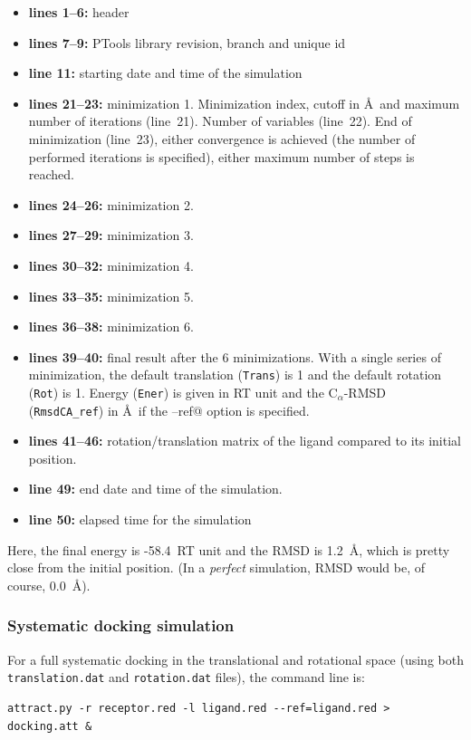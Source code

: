\documentclass[12pt,a4paper]{article}
\begin{document}
\begin{itemize}
\item{\bf lines 1--6:} header
\item{\bf lines 7--9:} PTools library revision, branch and unique id
\item{\bf line 11:} starting date and time of the simulation
\item{\bf lines 21--23:} minimization 1. Minimization index, cutoff 
in \AA\ and maximum number of iterations (line~21). 
Number of variables (line~22). End of minimization (line~23), either 
convergence is achieved (the number of performed iterations is specified), 
either maximum number of steps is reached.
\item{\bf lines 24--26:} minimization 2.
\item{\bf lines 27--29:} minimization 3.
\item{\bf lines 30--32:} minimization 4.
\item{\bf lines 33--35:} minimization 5.
\item{\bf lines 36--38:} minimization 6.
\item{\bf lines 39--40:} final result after the 6 minimizations. With a single series of minimization, the default translation ({\tt Trans}) is 1 and the default rotation ({\tt Rot}) is 1. 
Energy ({\tt Ener}) is given in RT unit and the C$_{\alpha}$-RMSD 
({\tt RmsdCA\_ref}) in \AA\ if the \verb@--ref@ option is specified.
\item{\bf lines 41--46:} rotation/translation matrix of the ligand compared to its initial position.
\item{\bf line 49:} end date and time of the simulation.
\item{\bf line 50:} elapsed time for the simulation
\end{itemize}

Here, the final energy is -58.4~RT unit and the RMSD is 1.2~\AA, which is pretty close from the initial position. (In a \emph{perfect} simulation, RMSD would be, of course, 0.0~\AA).

\subsubsection{Systematic docking simulation}

For a full systematic docking in the translational and rotational space (using both {\tt translation.dat} and {\tt rotation.dat} files), the command line is:
\begin{verbatim}
attract.py -r receptor.red -l ligand.red --ref=ligand.red > docking.att &
\end{verbatim}
\end{document}
